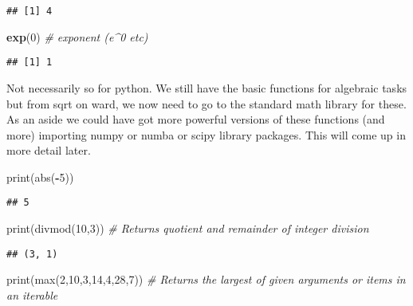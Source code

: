 \documentclass[]{book}
\newenvironment{Shaded}{\begin{snugshade}}{\end{snugshade}}
\newcommand{\KeywordTok}[1]{\textcolor[rgb]{0.13,0.29,0.53}{\textbf{#1}}}
\newcommand{\DecValTok}[1]{\textcolor[rgb]{0.00,0.00,0.81}{#1}}
\newcommand{\CommentTok}[1]{\textcolor[rgb]{0.56,0.35,0.01}{\textit{#1}}}
\newcommand{\OperatorTok}[1]{\textcolor[rgb]{0.81,0.36,0.00}{\textbf{#1}}}
\newcommand{\BuiltInTok}[1]{#1}
\newcommand{\NormalTok}[1]{#1}
\theoremstyle{definition}
\theoremstyle{definition}
\theoremstyle{definition}
\theoremstyle{remark}
\begin{document}
\begin{verbatim}
## [1] 4
\end{verbatim}

\begin{Shaded}
\begin{Highlighting}[]
\KeywordTok{exp}\NormalTok{(}\DecValTok{0}\NormalTok{)           }\CommentTok{# exponent (e^0 etc)}
\end{Highlighting}
\end{Shaded}

\begin{verbatim}
## [1] 1
\end{verbatim}

Not necessarily so for python. We still have the basic functions for
algebraic tasks but from sqrt on ward, we now need to go to the standard
math library for these. As an aside we could have got more powerful
versions of these functions (and more) importing numpy or numba or scipy
library packages. This will come up in more detail later.

\begin{Shaded}
\begin{Highlighting}[]
\BuiltInTok{print}\NormalTok{(}\BuiltInTok{abs}\NormalTok{(}\OperatorTok{-}\DecValTok{5}\NormalTok{))}
\end{Highlighting}
\end{Shaded}

\begin{verbatim}
## 5
\end{verbatim}

\begin{Shaded}
\begin{Highlighting}[]
\BuiltInTok{print}\NormalTok{(}\BuiltInTok{divmod}\NormalTok{(}\DecValTok{10}\NormalTok{,}\DecValTok{3}\NormalTok{))             }\CommentTok{# Returns quotient and remainder of integer division}
\end{Highlighting}
\end{Shaded}

\begin{verbatim}
## (3, 1)
\end{verbatim}

\begin{Shaded}
\begin{Highlighting}[]
\BuiltInTok{print}\NormalTok{(}\BuiltInTok{max}\NormalTok{(}\DecValTok{2}\NormalTok{,}\DecValTok{10}\NormalTok{,}\DecValTok{3}\NormalTok{,}\DecValTok{14}\NormalTok{,}\DecValTok{4}\NormalTok{,}\DecValTok{28}\NormalTok{,}\DecValTok{7}\NormalTok{))    }\CommentTok{# Returns the largest of given arguments or items in an iterable}
\end{Highlighting}
\end{Shaded}
\end{document}
